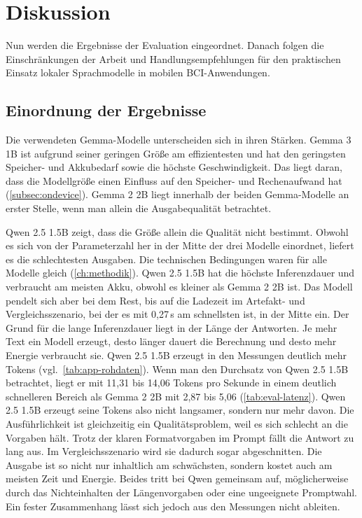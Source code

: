 \chapter{Diskussion}
\label{ch:diskussion}
Nun werden die Ergebnisse der Evaluation eingeordnet. Danach folgen die Einschränkungen der Arbeit und Handlungsempfehlungen für den praktischen Einsatz lokaler Sprachmodelle in mobilen BCI-Anwendungen.

\section{Einordnung der Ergebnisse}
\label{sec:einordnung}
Die verwendeten Gemma-Modelle unterscheiden sich in ihren Stärken. Gemma 3 1B ist aufgrund seiner geringen Größe am effizientesten und hat den geringsten Speicher- und Akkubedarf sowie die höchste Geschwindigkeit. Das liegt daran, dass die Modellgröße einen Einfluss auf den Speicher- und Rechenaufwand hat (\autoref{subsec:ondevice}). Gemma 2 2B liegt innerhalb der beiden Gemma-Modelle an erster Stelle, wenn man allein die Ausgabequalität betrachtet.
\vspace{\baselineskip}

\noindent Qwen 2.5 1.5B zeigt, dass die Größe allein die Qualität nicht bestimmt. Obwohl es sich von der Parameterzahl her in der Mitte der drei Modelle einordnet, liefert es die schlechtesten Ausgaben. Die technischen Bedingungen waren für alle Modelle gleich (\autoref{ch:methodik}).
Qwen 2.5 1.5B hat die höchste Inferenzdauer und verbraucht am meisten Akku, obwohl es kleiner als Gemma 2 2B ist. Das Modell pendelt sich aber bei dem Rest, bis auf die Ladezeit im Artefakt- und Vergleichsszenario, bei der es mit 0,27\,s am schnellsten ist, in der Mitte ein. Der Grund für die lange Inferenzdauer liegt in der Länge der Antworten. Je mehr Text ein Modell erzeugt, desto länger dauert die Berechnung und desto mehr Energie verbraucht sie. Qwen 2.5 1.5B erzeugt in den Messungen deutlich mehr Tokens (vgl.\ \autoref{tab:app-rohdaten}). Wenn man den Durchsatz von Qwen 2.5 1.5B betrachtet, liegt er mit 11,31 bis 14,06 Tokens pro Sekunde in einem deutlich schnelleren Bereich als Gemma 2 2B mit 2,87 bis 5,06 (\autoref{tab:eval-latenz}). Qwen 2.5 1.5B erzeugt seine Tokens also nicht langsamer, sondern nur mehr davon. Die Ausführlichkeit ist gleichzeitig ein Qualitätsproblem, weil es sich schlecht an die Vorgaben hält. Trotz der klaren Formatvorgaben im Prompt fällt die Antwort zu lang aus. Im Vergleichsszenario wird sie dadurch sogar abgeschnitten. Die Ausgabe ist so nicht nur inhaltlich am schwächsten, sondern kostet auch am meisten Zeit und Energie. Beides tritt bei Qwen gemeinsam auf, möglicherweise durch das Nichteinhalten der Längenvorgaben oder eine ungeeignete Promptwahl. Ein fester Zusammenhang lässt sich jedoch aus den Messungen nicht ableiten.
\vspace{\baselineskip}

